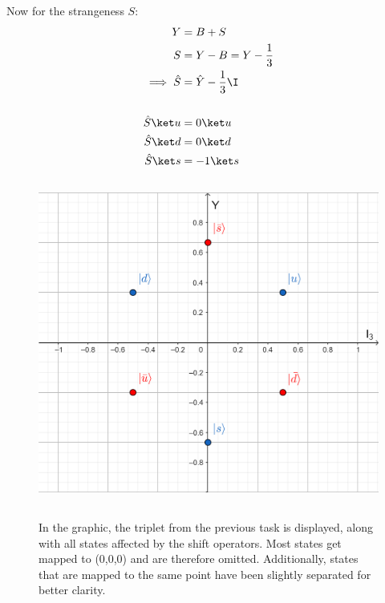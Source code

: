 \documentclass[exb,en]{exercise_5.0}
\begin{document}
Now for the strangeness $S$:
\begin{align*}
    Y &= B+S\\
    S &= Y-B = Y - \frac13\\
    \implies \hat S &= \hat Y - \frac13\I\\
    \\
    \hat S \ket u &= 0\ket u\\
    \hat S \ket d &= 0\ket d\\
    \hat S \ket s &= -1 \ket s \\
\end{align*}

\subsection{}
\begin{figure}[H]
    \centering
    \includegraphics[width=.8\textwidth]{geogebra.png}
\end{figure}

\subsection{}
\begin{figure}[H]
    \centering
    
    \caption{In the graphic, the triplet from the previous task is displayed, along with all states affected by the shift operators. Most states get mapped to (0,0,0) and are therefore omitted. Additionally, states that are mapped to the same point have been slightly separated for better clarity.}
\end{figure}
\end{document}
